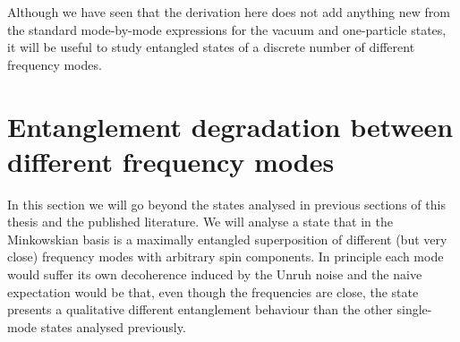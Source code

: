 Although we have seen that the derivation here does not add anything new from the standard mode-by-mode expressions for the vacuum and one-particle states, it will be useful to study entangled states of a discrete number of different frequency modes.



\section[Entanglement degradation between different modes]{Entanglement degradation between different frequency modes}\label{caso2}

In this section we will go beyond the states analysed in previous sections of this thesis and the published literature. We will analyse a state that in the Minkowskian basis is a maximally entangled superposition of different (but very close) frequency modes with arbitrary spin components. In principle each mode would suffer its own decoherence induced by the Unruh noise and the naive expectation would be that, even though the frequencies are close, the state presents a qualitative different entanglement behaviour than the other single-mode states analysed previously.


